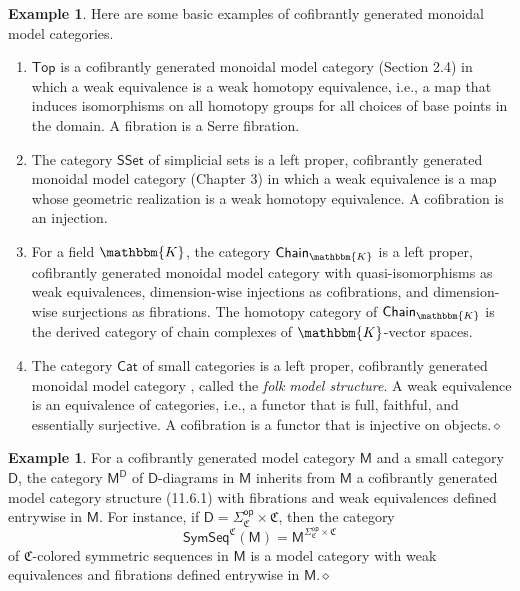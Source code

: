 \documentclass[11pt]{amsbook}
\numberwithin{section}{chapter}
\numberwithin{subsection}{section}
\numberwithin{equation}{section}
\theoremstyle{plain}
\theoremstyle{definition}
\newtheorem{example}[equation]{Example}
\newcommand{\fieldk}{\mathbbm{K}}
\newcommand{\colorc}{\mathfrak{C}}
\newcommand{\op}{\mathsf{op}}
\newcommand{\D}{\mathsf{D}}
\newcommand{\M}{\mathsf{M}}
\newcommand{\dqed}{\hfill$\diamond$}
\newcommand{\Cat}{\mathsf{Cat}}
\newcommand{\Chaink}{\mathsf{Chain}_{\fieldk}}
\newcommand{\Sset}{\mathsf{SSet}}
\newcommand{\Top}{\mathsf{Top}}
\newcommand{\Sigmaop}{\Sigma^{\op}}
\newcommand{\Sigmacop}{\Sigmaop_{\colorc}}
\newcommand{\Sigmacopc}{\Sigmacop\times\colorc}
\newcommand{\symseq}{\mathsf{SymSeq}}
\newcommand{\symseqcm}{\symseq^{\colorc}(\M)}
\begin{document}
\begin{example}\label{ex:model-cate}
Here are some basic examples of cofibrantly generated monoidal model categories.
\begin{enumerate}\item $\Top$ is a cofibrantly generated monoidal model category \cite{hovey} (Section 2.4) in which a weak equivalence is a weak homotopy equivalence, i.e., a map that induces isomorphisms on all homotopy groups for all choices of base points in the domain.  A fibration is a Serre fibration. 
\item The category $\Sset$ of simplicial sets is a left proper, cofibrantly generated monoidal model category \cite{hovey} (Chapter 3) in which a weak equivalence is a map whose geometric realization is a weak homotopy equivalence.  A cofibration is an injection.
\item For a field $\fieldk$, the category $\Chaink$ is a left proper, cofibrantly generated monoidal  model category \cite{quillen} with quasi-isomorphisms as weak equivalences, dimension-wise injections as cofibrations, and dimension-wise surjections as fibrations.  The homotopy category of $\Chaink$ is the derived category of chain complexes of $\fieldk$-vector spaces. 
\item The category $\Cat$ of small categories is a left proper, cofibrantly generated monoidal model category \cite{rezk}, called the \emph{folk model structure}.  A weak equivalence is an equivalence of categories, i.e., a functor that is full, faithful, and essentially surjective.  A cofibration is a functor that is injective on objects.\dqed
\end{enumerate}\end{example}
 
\begin{example}\label{ex:cofgen-diagram}
For a cofibrantly generated model category $\M$ and a small category $\D$, the category $\M^{\D}$ of $\D$-diagrams in $\M$ inherits from $\M$ a cofibrantly generated model category structure \cite{hirschhorn} (11.6.1) with fibrations and weak equivalences defined entrywise in $\M$.  For instance, if $\D = \Sigmacopc$, then the category \[\symseqcm = \M^{\Sigmacopc}\] of $\colorc$-colored symmetric sequences in $\M$ is a model category with weak equivalences and fibrations defined entrywise in $\M$.\dqed\end{example}
\end{document}
